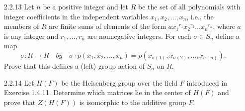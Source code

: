 \begin{enumerate}
   \item[2.2.13]  Let $n$ be a positive integer and let $R$ be the set of all
                  polynomials with integer coefficients in the independent
                  variables $x_1, x_2, \ldots, x_n$, i.e., the members of $R$
                  are finite sums of elements of the form
                  $a{x_1}^{r_1}{x_2}^{r_2}\ldots{x_n}^{r_n}$, where $a$ is any
                  integer and $r_1, \ldots, r_n$ are nonnegative integers. For
                  each $\sigma \in S_n$ define a map
                  $$\sigma : R \rightarrow R \quad by \quad
                    \sigma \cdot p(x_1, x_2, \ldots, x_n) = p(x_{\sigma(1)},
                    x_{\sigma(2)}, \ldots, x_{\sigma(n)}).$$
                  Prove that this defines a (left) group action of $S_n$ on $R$.
   \item[2.2.14]  Let $H(F)$ be the Heisenberg group over the field $F$
                  introduced in Exercise 1.4.11. Determine which matrices lie in
                  the center of $H(F)$ and prove that $Z(H(F))$ is isomorphic to
                  the additive group $F$.
\end{enumerate}
